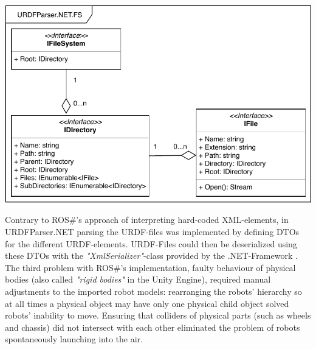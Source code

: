 \begin{center}
    \noindent
    \includegraphics[width=14cm]{tex/img/ch05/URDFParser_FileSystemInterfaces.pdf}
    \label{fig:filesystem}
\end{center}
Contrary to ROS\#'s approach of interpreting hard-coded XML-elements, in URDFParser.NET parsing the URDF-files was implemented by defining \acp{DTO} for the different URDF-elements. URDF-Files could then be deserialized using these \acsp{DTO} with the \emph{"XmlSerializer"}-class provided by the .NET-Framework \cite{XmlSerializer}.\\
The third problem with ROS\#'s implementation, faulty behaviour of physical bodies (also called \emph{"rigid bodies"} in the Unity Engine), required manual adjustments to the imported robot models: rearranging the robots' hierarchy so at all times a physical object may have only one physical child object solved robots' inability to move. Ensuring that colliders of physical parts (such as wheels and chassis) did not intersect with each other eliminated the problem of robots spontaneously launching into the air. 

